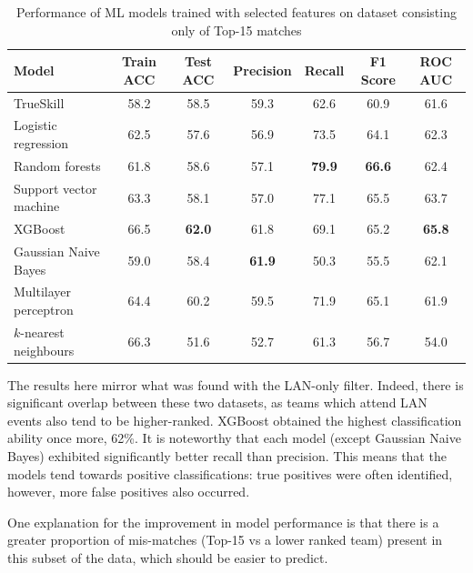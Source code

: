 \begin{table}[h!]
	\centering
	\small
	\begin{adjustbox}{center} %
		\begin{tabular}{ |l|c|c|c|c|c|c| }
			\hline
			\rule{0pt}{2.6ex} \textbf{Model} & \textbf{Train ACC} & \textbf{Test ACC} & \textbf{Precision} & \textbf{Recall} & \textbf{F1 Score} & \textbf{ROC AUC} \\
			\hline
			\rule{0pt}{2.6ex} TrueSkill 				& 58.2 & 58.5 & 59.3 & 62.6 & 60.9 & 61.6 \\ \hline
			\rule{0pt}{2.6ex} Logistic regression 		& 62.5 & 57.6 & 56.9 & 73.5 & 64.1 & 62.3 \\
			\rule{0pt}{2.6ex} Random forests			& 61.8 & 58.6 & 57.1 & \textbf{79.9} & \textbf{66.6} & 62.4 \\
			\rule{0pt}{2.6ex} Support vector machine 	& 63.3 & 58.1 & 57.0 & 77.1 & 65.5 & 63.7 \\
			\rule{0pt}{2.6ex} XGBoost 					& 66.5 & \textbf{62.0} & 61.8 & 69.1 & 65.2 & \textbf{65.8} \\
			\rule{0pt}{2.6ex} Gaussian Naive Bayes 		& 59.0 & 58.4 & \textbf{61.9} & 50.3 & 55.5 & 62.1 \\
			\rule{0pt}{2.6ex} Multilayer perceptron     & 64.4 & 60.2 & 59.5 & 71.9 & 65.1 & 61.9 \\
			\rule{0pt}{2.6ex} $k$-nearest neighbours 	& 66.3 & 51.6 & 52.7 & 61.3 & 56.7 & 54.0 \\
			\hline
		\end{tabular}
	\end{adjustbox}
	\caption{Performance of ML models trained with selected features on dataset consisting only of Top-15 matches}
	\label{table:5}
\end{table}

The results here mirror what was found with the LAN-only filter. Indeed, there is significant overlap between these two datasets, as teams which attend LAN events also tend to be higher-ranked. XGBoost obtained the highest classification ability once more, 62\%. It is noteworthy that each model (except Gaussian Naive Bayes) exhibited significantly better recall than precision. This means that the models tend towards positive classifications: true positives were often identified, however, more false positives also occurred.

One explanation for the improvement in model performance is that there is a greater proportion of mis-matches (Top-15 vs a lower ranked team) present in this subset of the data, which should be easier to predict.


